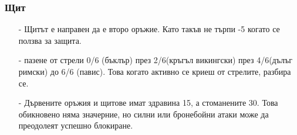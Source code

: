 \subsubsection{Щит}
\begin{itemize}
\item[-]{Щитът е направен да е второ оръжие. Като такъв не търпи -5 когато се ползва за защита.}
\item[-]{пазене от стрели 0/6 (бъклър) през 2/6(кръгъл викингски) през 4/6(дълъг римски) до 6/6 (павис). Това когато активно се криеш от стрелите, разбира се.}
\item[-]{Дървените оръжия и щитове имат здравина 15, а стоманените 30. Това обикновено няма значерние, но силни или бронебойни атаки може да преодолеят успешно блокиране.}
\end{itemize}

